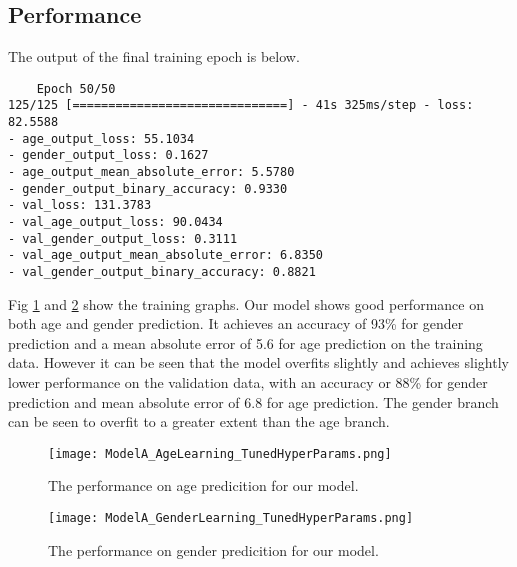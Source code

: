 \subsection{Performance}
The output of the final training epoch is below.

\begin{verbatim}
    Epoch 50/50
125/125 [==============================] - 41s 325ms/step - loss: 82.5588 
- age_output_loss: 55.1034 
- gender_output_loss: 0.1627 
- age_output_mean_absolute_error: 5.5780 
- gender_output_binary_accuracy: 0.9330 
- val_loss: 131.3783 
- val_age_output_loss: 90.0434 
- val_gender_output_loss: 0.3111 
- val_age_output_mean_absolute_error: 6.8350 
- val_gender_output_binary_accuracy: 0.8821
\end{verbatim}

Fig \ref{fig:ModelAPerformanceAge} and \ref{fig:ModelAPerformanceGender}
show the training graphs. Our model shows good performance on both age and gender prediction. It achieves an accuracy
of 93\% for gender prediction and a mean absolute error of 5.6 for age prediction on the training data. 
However it can be seen that the model overfits slightly and achieves slightly lower performance on the validation
data, with an accuracy or 88\% for gender prediction and mean absolute error of 6.8 for age prediction. The gender 
branch can be seen to overfit to a greater extent than the age branch.

\begin{figure}
    \centering
    \texttt{[image: ModelA\_AgeLearning\_TunedHyperParams.png]}
    \caption{\label{fig:ModelAPerformanceAge} The performance on age predicition for our model.}
\end{figure}


\begin{figure}
    \centering
    \texttt{[image: ModelA\_GenderLearning\_TunedHyperParams.png]}
    \caption{\label{fig:ModelAPerformanceGender} The performance on gender predicition for our model.}
\end{figure}


